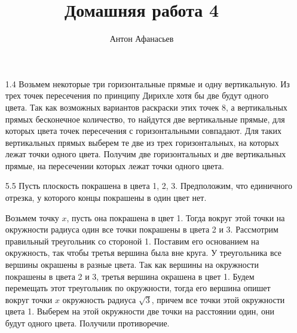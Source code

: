 \documentclass[10pt]{article}
\begin{document}
\title{Домашняя работа 4}
\author{Антон Афанасьев}
\maketitle

\begin{enumerate}
\item[1.4] Возьмем некоторые три горизонтальные прямые и одну вертикальную. Из трех точек пересечения по принципу Дирихле хотя бы две будут одного цвета. Так как возможных вариантов раскраски этих точек 8, а вертикальных прямых бесконечное количество, то найдутся две вертикальные прямые, для которых цвета точек пересечения с горизонтальными совпадают. Для таких вертикальных прямых выберем те две из трех горизонтальных, на которых лежат точки одного цвета. Получим две горизонтальных и две вертикальных прямые, на пересечении которых лежат точки одного цвета.

\item[5.5] Пусть плоскость покрашена в цвета 1, 2, 3. Предположим, что единичного отрезка, у которого концы покрашены в один цвет нет. 

Возьмем точку $x$, пусть она покрашена в цвет 1. Тогда вокруг этой точки на окружности радиуса один все точки покрашены в цвета 2 и 3. Рассмотрим правильный треугольник со стороной 1. Поставим его основанием на окружность, так чтобы третья вершина была вне круга. У треугольника все вершины окрашены в разные цвета. Так как вершины на окружности покрашены в цвета 2 и 3, третья вершина окрашена в цвет 1. Будем перемещать этот треугольник по окружности, тогда его вершина опишет вокруг точки $x$ окружность радиуса $\sqrt{3}$, причем все точки этой окружности цвета 1. Выберем на этой окружности две точки на расстоянии один, они будут одного цвета. Получили противоречие.

\end{enumerate}
\end{document}
